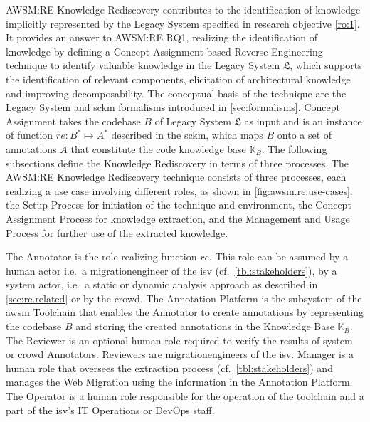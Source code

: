 AWSM:RE Knowledge Rediscovery contributes to the identification of knowledge implicitly represented by the \gls{Legacy System} specified in research objective \cref{ro:1}.
It provides an answer to AWSM:RE RQ1, realizing the identification of knowledge by defining a \gls{Concept Assignment}-based \gls{Reverse Engineering} technique to identify valuable knowledge in the \gls{Legacy System} \(\mathfrak L\), which supports the identification of relevant components, elicitation of architectural knowledge and improving decomposability.
The conceptual basis of the technique are the \gls{Legacy System} and \gls{sckm} formalisms introduced in \cref{sec:formalisms}.
\gls{Concept Assignment} takes the codebase \(B\) of \gls{Legacy System} \(\mathfrak{L}\) as input and is an instance of function \(re: B^* \mapsto A^*\) described in the \gls{sckm}, which maps \(B\) onto a set of annotations \(A\) that constitute the  code knowledge base \(\mathbb{K}_{B}\).
The following subsections define the Knowledge Rediscovery in terms of three processes.
%
The AWSM:RE Knowledge Rediscovery technique consists of three processes, each realizing a use case involving different roles, as shown in \cref{fig:awsm.re.use-cases}: the Setup Process for initiation of the technique and environment, the \gls{Concept Assignment} Process for knowledge extraction, and the Management and Usage Process for further use of the extracted knowledge.



The Annotator is the role realizing function \(re\).
This role can be assumed by a human actor i.e.~a \gls{migrationengineer} of the \gls{isv} (cf.~\cref{tbl:stakeholders}), by a system actor, i.e.~a static or dynamic analysis approach as described in \cref{sec:re.related} or by the crowd.
The Annotation Platform is the subsystem of the \gls{awsm} Toolchain that enables the Annotator to create annotations by representing the codebase \(B\) and storing the created annotations in the Knowledge Base \(\mathbb{K}_{B}\).
The Reviewer is an optional human role required to verify the results of system or crowd Annotators.
Reviewers are \glspl{migrationengineer} of the \gls{isv}.
Manager is a human role that oversees the extraction process (cf.~\cref{tbl:stakeholders}) and manages the \gls{Web Migration} using the information in the Annotation Platform.
The Operator is a human role responsible for the operation of the toolchain and a part of the \gls{isv}'s IT Operations or DevOps staff.

